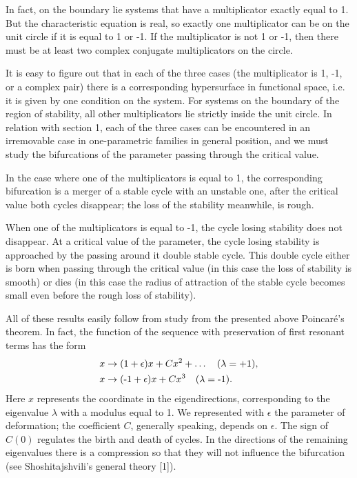 \documentclass[12pt]{amsart}
\begin{document}
In fact, on the boundary lie systems that have a multiplicator exactly equal to 1.
But the characteristic equation is real, so exactly one multiplicator can be on
the unit circle if it is equal to 1 or -1.
If the multiplicator is not 1 or -1, then there must be at least two complex
conjugate multiplicators on the circle.

It is easy to figure out that in each of the three cases (the multiplicator is
1, -1, or a complex pair) there is a corresponding hypersurface in functional
space, i.e. it is given by one condition on the system.
For systems on the boundary of the region of stability, all other multiplicators
lie strictly inside the unit circle.
In relation with section 1, each of the three cases can be encountered in an
irremovable case in one-parametric families in general position, and we must
study the bifurcations of the parameter passing through the critical value.

In the case where one of the multiplicators is equal to 1, the corresponding
bifurcation is a merger of a stable cycle with an unstable one, after the
critical value both cycles disappear; the loss of the stability meanwhile, is
rough.

When one of the multiplicators is equal to -1, the cycle losing stability does
not disappear.
At a critical value of the parameter, the cycle losing stability is approached
by the passing around it double stable cycle.
This double cycle either is born when passing through the critical value (in
this case the loss of stability is smooth) or dies (in this case the radius of
attraction of the stable cycle becomes small even before the rough loss of
stability).

All of these results easily follow from study from the presented above
Poincar\'e's theorem.
In fact, the function of the sequence with preservation of first resonant terms
has the form
\begin{align*}
&x\to(1+\epsilon)x+Cx^2+\dots\quad(\lambda=+1),\\
&x\to(\text-1+\epsilon)x+Cx^3\quad(\lambda=\text-1).
\end{align*}
Here $x$ represents the coordinate in the eigendirections, corresponding to the
eigenvalue $\lambda$ with a modulus equal to 1.
We represented with $\epsilon$ the parameter of deformation; the coefficient
$C$, generally speaking, depends on $\epsilon$.
The sign of $C(0)$ regulates the birth and death of cycles.
In the directions of the remaining eigenvalues there is a compression so that
they will not influence the bifurcation (see Shoshitajshvili's general theory
[1]).
\end{document}
